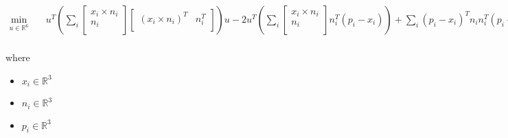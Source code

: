\documentclass[12pt]{article}
\begin{document}
\[
\begin{aligned} \min_{\textit{u} \in \mathbb{R}^{ 6}} \quad & \textit{u}^T(\sum_\textit{i} \begin{bmatrix}
\textit{x}_{ \textit{i} } × \textit{n}_{ \textit{i} }\\
\textit{n}_{ \textit{i} }\\
\end{bmatrix}\begin{bmatrix}
(\textit{x}_{ \textit{i} } × \textit{n}_{ \textit{i} })^T & \textit{n}_{ \textit{i} }^T\\
\end{bmatrix})\textit{u} - 2\textit{u}^T(\sum_\textit{i} \begin{bmatrix}
\textit{x}_{ \textit{i} } × \textit{n}_{ \textit{i} }\\
\textit{n}_{ \textit{i} }\\
\end{bmatrix}\textit{n}_{ \textit{i} }^T(\textit{p}_{ \textit{i} } - \textit{x}_{ \textit{i} })) + \sum_\textit{i} (\textit{p}_{ \textit{i} } - \textit{x}_{ \textit{i} })^T\textit{n}_{ \textit{i} }\textit{n}_{ \textit{i} }^T(\textit{p}_{ \textit{i} } - \textit{x}_{ \textit{i} }) \\
\end{aligned}
\]

where
\begin{itemize}
\item $\textit{x}_{\textit{i}} \in \mathbb{R}^{ 3}$
\item $\textit{n}_{\textit{i}} \in \mathbb{R}^{ 3}$
\item $\textit{p}_{\textit{i}} \in \mathbb{R}^{ 3}$
\end{itemize}
\end{document}
